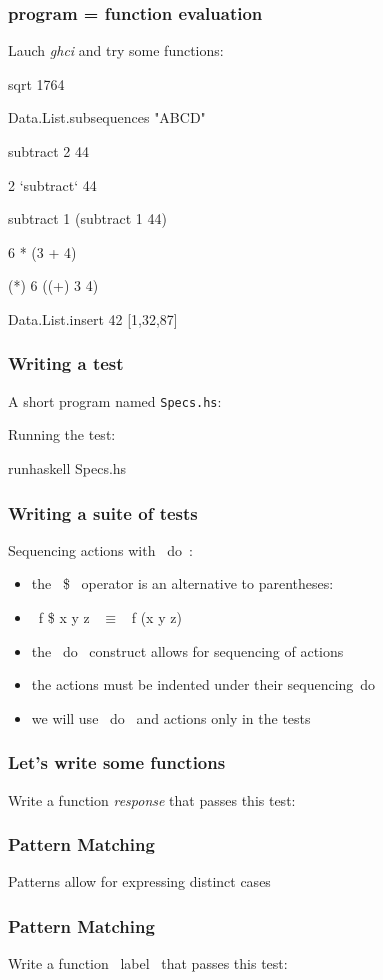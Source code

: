 \documentclass[11pt,xcolor={dvipsnames}]{beamer}
\newcommand{\tc}{\textcolor}
\newcommand{\key}[1]{\tc{orange}{#1}}
\newcommand{\rk}{\enskip{\key{$\hookleftarrow$}}}
\newcommand{\vs}{\vspace{1em}}
\newcommand{\lstH}[1]{}
\newcommand{\lstT}[1]{}
\begin{document}
\begin{frame}[fragile]
\frametitle{program = function evaluation}
Lauch \emph{ghci} and try some functions:
\begin{term}
sqrt 1764\rk

Data.List.subsequences "ABCD"\rk

subtract 2 44\rk

 2 `subtract` 44\rk

subtract 1 (subtract 1 44)\rk

6 * (3 + 4)\rk

(*) 6 ((+) 3 4)\rk

Data.List.insert 42 [1,32,87]\rk
\end{term}
\end{frame}
\begin{frame}[fragile]
\frametitle{Writing a test}

A short program named \texttt{Specs.hs}:
\lstT{005}
\vs
Running the test:
\begin{term}
runhaskell Specs.hs\rk
\end{term}
\end{frame}
\begin{frame}[fragile]
\frametitle{Writing a suite of tests}
Sequencing actions with ~do~:
\lstT{006}
\begin{itemize}
\item the ~\$~ operator is an alternative to parentheses:
\item ~f \$ x y z~ $\equiv$ ~f (x y z)~
\item the ~do~ construct allows for sequencing of actions
\item the actions must be indented under their sequencing~do~ 
\item we will use ~do~ and actions only in the tests
\end{itemize}
\end{frame}
\begin{frame}[fragile]
\frametitle{Let's write some functions}
Write a function \emph{response} that passes this test:
\lstT{007}
\end{frame}
\begin{frame}[fragile]
\frametitle{Pattern Matching}
\lstH{008}
\vs
Patterns allow for expressing distinct cases 
\end{frame}
\begin{frame}[fragile]
\frametitle{Pattern Matching}
Write a function ~label~ that passes this test:

\lstT{009}
\end{frame}
\end{document}
